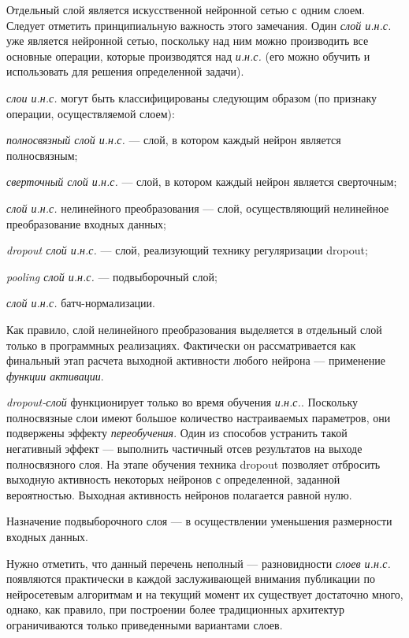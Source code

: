 Отдельный слой является искусственной нейронной сетью с одним слоем.
Следует отметить принципиальную важность этого замечания. Один \textit{слой и.н.с.} уже является нейронной сетью, поскольку над ним можно производить все основные операции, которые производятся над  \textit{и.н.с.} (его можно обучить и использовать для решения определенной задачи).

\textit{слои и.н.с.} могут быть классифицированы следующим образом (по признаку операции, осуществляемой слоем):
\begin{textitemize}
	\item \textit{полносвязный слой и.н.с.} --- слой, в котором каждый нейрон является полносвязным;
	\item \textit{сверточный слой и.н.с.} --- слой, в котором каждый нейрон является сверточным;
	\item \textit{слой и.н.с.} нелинейного преобразования --- слой, осуществляющий нелинейное преобразование входных данных;
	\item \textit{dropout слой и.н.с.} --- слой, реализующий технику регуляризации dropout;
	\item \textit{pooling слой и.н.с.} --- подвыборочный слой;
	\item \textit{слой и.н.с.} батч-нормализации.
\end{textitemize}

Как правило, слой нелинейного преобразования выделяется в отдельный слой только в программных реализациях. Фактически он рассматривается как финальный этап расчета выходной активности любого нейрона --- применение \textit{функции активации}.

\textit{dropout-слой} функционирует только во время обучения \textit{и.н.с.}. Поскольку полносвязные слои имеют большое количество настраиваемых параметров, они подвержены эффекту \textit{переобучения}. Один из способов устранить такой негативный эффект --- выполнить частичный отсев результатов на выходе полносвязного слоя. На этапе обучения техника dropout позволяет отбросить выходную активность некоторых нейронов с определенной, заданной вероятностью. Выходная активность  нейронов полагается равной нулю.

Назначение подвыборочного слоя --- в осуществлении уменьшения размерности входных данных.

Нужно отметить, что данный перечень неполный --- разновидности \textit{слоев и.н.с.} появляются практически в каждой заслуживающей внимания публикации по нейросетевым алгоритмам и на текущий момент их существует достаточно много, однако, как правило, при построении более традиционных архитектур ограничиваются только приведенными вариантами слоев.

